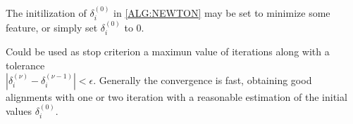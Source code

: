 %
%
%


The initilization of $\delta_i ^{(0)}$  in \ref{ALG:NEWTON} may be set to minimize some feature, or
simply set $\delta_i ^{(0)}$ to $0$.

Could be used as stop criterion a maximun value of iterations along with a
tolerance \\ $| \delta_i ^{(\nu)} - \delta_i ^{(\nu-1)} | < \epsilon$.
Generally the convergence is fast, obtaining good alignments with one or two
iteration with a reasonable estimation of the initial values $\delta_i ^{(0)}$.
